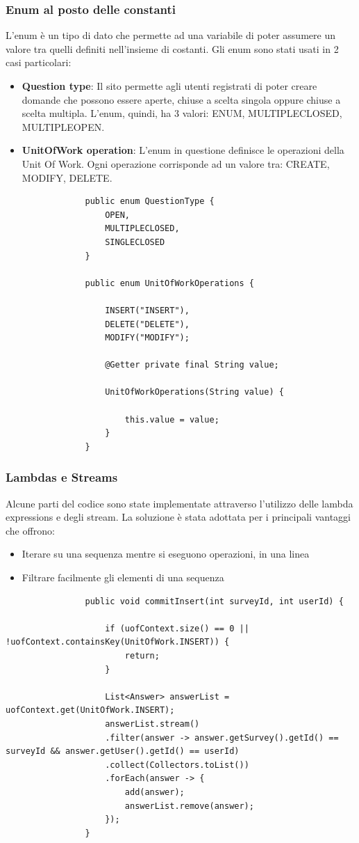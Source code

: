 \documentclass[12pt]{article}
\begin{document}
			\subsubsection{Enum al posto delle constanti}
			L'enum è un tipo di dato che permette ad una variabile di poter assumere un valore tra quelli definiti nell'insieme di costanti. Gli enum sono stati usati in 2 casi particolari:
			\begin{itemize}
				\item \textbf{Question type}: Il sito permette agli utenti registrati di poter creare domande che possono essere aperte, chiuse a scelta singola oppure chiuse a scelta multipla. L'enum, quindi, ha 3 valori: ENUM, MULTIPLECLOSED, MULTIPLEOPEN.
				\item \textbf{UnitOfWork operation}: L'enum in questione definisce le operazioni della Unit Of Work. Ogni operazione corrisponde ad un valore tra: CREATE, MODIFY, DELETE.
			\end{itemize}
			\begin{lstlisting}
				public enum QuestionType {
					OPEN,
					MULTIPLECLOSED,
					SINGLECLOSED
				}
				
				public enum UnitOfWorkOperations {
					
					INSERT("INSERT"),
					DELETE("DELETE"),
					MODIFY("MODIFY");
					
					@Getter	private final String value;
					
					UnitOfWorkOperations(String value) {
						
						this.value = value;
					}
				}
			\end{lstlisting}
			\newpage
			\subsubsection{Lambdas e Streams}
			Alcune parti del codice sono state implementate attraverso l'utilizzo delle lambda expressions e degli stream. La soluzione è stata adottata per i principali vantaggi che offrono: 
			\begin{itemize}
				\item Iterare su una sequenza mentre si eseguono operazioni, in una linea
				\item Filtrare facilmente gli elementi di una sequenza
			\end{itemize}
			\begin{lstlisting}
				public void commitInsert(int surveyId, int userId) {
					
					if (uofContext.size() == 0 || !uofContext.containsKey(UnitOfWork.INSERT)) {
						return;
					}
					
					List<Answer> answerList = uofContext.get(UnitOfWork.INSERT);
					answerList.stream()
					.filter(answer -> answer.getSurvey().getId() == surveyId && answer.getUser().getId() == userId)
					.collect(Collectors.toList())
					.forEach(answer -> {
						add(answer);
						answerList.remove(answer);
					});
				}
			\end{lstlisting}
			
			
			
		
\end{document}
